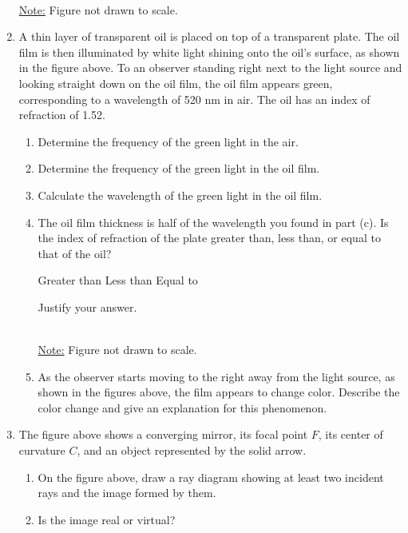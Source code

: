 \documentclass{../../../oss-apphys}
\begin{document}
\begin{enumerate}[leftmargin=15pt]
  \begin{center}
    \\
    \underline{Note:} Figure not drawn to scale.
  \end{center}
\item A thin layer of transparent oil is placed on top of a transparent plate.
  The oil film is then illuminated by white light shining onto the oil's
  surface, as shown in the figure above. To an observer standing right next to
  the light source and looking straight down on the oil film, the oil film
  appears green, corresponding to a wavelength of 520 nm in air. The oil has an
  index of refraction of 1.52.
  \begin{enumerate}
  \item Determine the frequency of the green light in the air.
  \item Determine the frequency of the green light in the oil film.
  \item Calculate the wavelength of the green light in the oil film.
  \item The oil film thickness is half of the wavelength you found in part (c).
    Is the index of refraction of the plate greater than, less than, or equal
    to that of the oil?

    \vspace{.1in}
    \underline{\hspace{.3in}} Greater than\hspace{.2in}
    \underline{\hspace{.3in}} Less than\hspace{.2in}
    \underline{\hspace{.3in}} Equal to
    
    \vspace{.1in}Justify your answer.

    \begin{center}
      \\
      \underline{Note:} Figure not drawn to scale.
    \end{center}
  \item As the observer starts moving to the right away from the light source,
    as shown in the figures above, the film appears to change color. Describe
    the color change and give an explanation for this phenomenon.
  \end{enumerate}
  \newpage

\item The figure above shows a converging mirror, its focal point $F$, its
  center of curvature $C$, and an object represented by the solid arrow.
  \begin{enumerate}
  \item On the figure above, draw a ray diagram showing at least two incident
    rays and the image formed by them.
  \item Is the image real or virtual?


\end{enumerate}
\end{enumerate}
\end{document}
